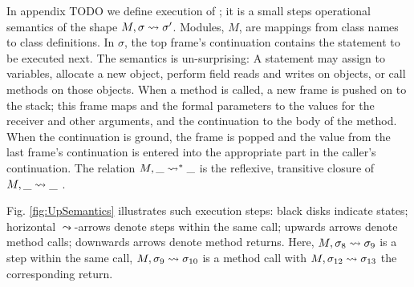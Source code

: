 In appendix TODO we  define execution  of \LangOO{};
 it is a small steps operational semantics of the shape $M, \sigma \leadsto {\sigma'}$. 
Modules, $M$, are mappings from class names to class definitions. 
In $\sigma$, the  top frame's continuation contains the statement to be  executed next.  
The semantics is un-surprising:  
 A statement may assign to variables, allocate a new object, 
perform field reads and writes on objects,  or
 call methods on those objects. 
When a method is called, a new frame is pushed on to the stack; this frame  maps  and the formal parameters to  the values for the receiver and other arguments, and the continuation to the body of the method.  When the continuation is ground, the frame is popped and the value from the last frame's continuation is entered into the appropriate part in the caller's continuation. 
The relation $M, \_ \leadsto^* {\_}$  is the reflexive, transitive closure of $M, \_ \leadsto {\_}$ .


{Fig. \ref{fig:UpSemantics} illustrates  such  execution steps:  black disks indicate states;
 horizontal $\leadsto$-arrows denote   steps  within the same  call; upwards arrows denote  method calls;
 downwards arrows denote method returns. %
 Here,   $M, \sigma_8 \leadsto {\sigma_9} $ is a step within the same call, $M, \sigma_9 \leadsto {\sigma_{10}} $ is a method call   
with $M, \sigma_{12} \leadsto {\sigma_{13}} $ %
the corresponding return. } 

